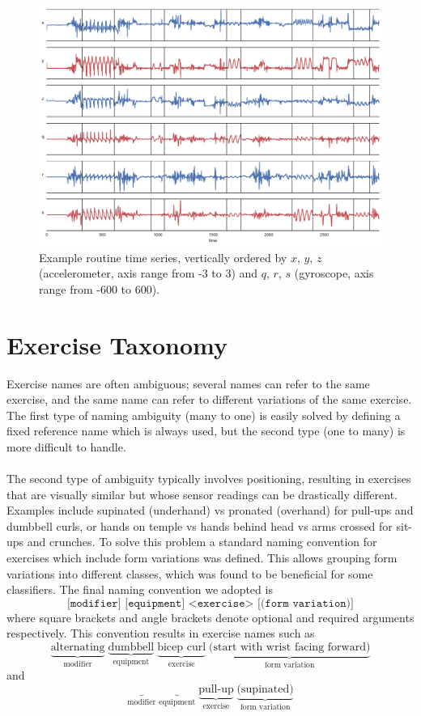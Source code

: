 \documentclass[12pt]{report}
\newcommand{\m}[1]{\texttt{#1}}
\newcommand{\1}[0]{\mathbbm{1}}
\begin{document}
\begin{figure}[ht!]
    \centering
    \includegraphics[width=1\textwidth]{img/routine_380.pdf}
    \caption[Example routine time series]{Example routine time series,
    vertically ordered by $x$, $y$, $z$ (accelerometer, axis range from -3 to 3)
    and $q$, $r$, $s$ (gyroscope, axis range from -600 to 600).}
    \label{fig:routine}
\end{figure}

\section{Exercise Taxonomy}
\label{sec:Exercise Taxonomy}
Exercise names are often ambiguous; several names can refer to the same exercise,
and the same name can refer to different variations of the same exercise.
The first type of naming ambiguity (many to one) is easily solved by defining a fixed reference name
which is always used, but the second type (one to many) is more difficult to handle.
\\\\
The second type of ambiguity typically involves positioning, resulting in exercises that are visually similar
but whose sensor readings can be drastically different.
Examples include supinated (underhand) vs pronated (overhand) for pull-ups and dumbbell curls,
or hands on temple vs hands behind head vs arms crossed for sit-ups and crunches. To solve this problem
a standard naming convention for exercises which include form variations was defined. This allows grouping
form variations into different classes, which was found to be beneficial for some classifiers.
The final naming convention we adopted is
\[
    \m{[modifier] [equipment] <exercise> [(form variation)]}
\]
where square brackets and angle brackets denote optional and required arguments respectively.
This convention results in exercise names such as
\[
    \underbrace{\text{alternating}}_{\text{modifier}} \; \underbrace{\text{dumbbell}}_{\text{equipment}} \; \underbrace{\text{bicep curl}}_{\text{exercise}} \; \underbrace{\text{(start with wrist facing forward)}}_{\text{form variation}}
\]
and
\[
    \underbrace{}_{\text{modifier}} \; \underbrace{}_{\text{equipment}} \; \underbrace{\text{pull-up}}_{\text{exercise}} \; \underbrace{\text{(supinated)}}_{\text{form variation}}
\]
\end{document}
